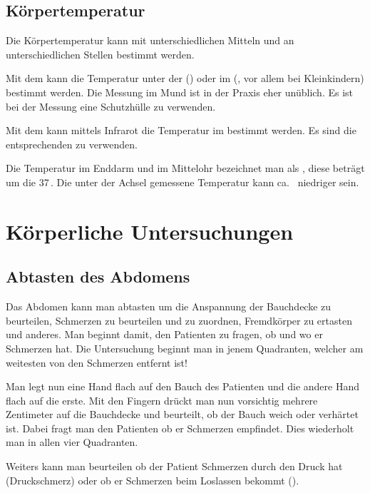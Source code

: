 \subsection{Körpertemperatur}

Die Körpertemperatur kann mit unterschiedlichen Mitteln und
an unterschiedlichen Stellen bestimmt werden. 

{
Mit dem
 kann die Temperatur
unter der  () oder im 
(, vor allem bei Kleinkindern) bestimmt werden. Die
Messung im Mund ist in der Praxis eher unüblich. Es ist bei der Messung eine
Schutzhülle zu verwenden. 

Mit dem  kann mittels Infrarot die
Temperatur im  bestimmt werden. Es sind die
entsprechenden  zu verwenden.

Die Temperatur im Enddarm und im Mittelohr bezeichnet man
als , diese beträgt um die
37\,\textcelsius. Die unter der Achsel gemessene Temperatur
kann ca. \,\textcelsius{} niedriger sein.
}{
{\SymbolText}
}


\section{Körperliche Untersuchungen}

\subsection{Abtasten des Abdomens}

{\label{topic:untersuchung-abdomen-abtasten}
Das Abdomen kann man abtasten um die Anspannung der
Bauchdecke zu beurteilen, Schmerzen zu
beurteilen und zu zuordnen, Fremdkörper zu ertasten und
anderes. Man beginnt damit, den Patienten zu fragen, ob und wo er 
Schmerzen hat. Die Untersuchung
beginnt man in jenem Quadranten, welcher am weitesten von den
Schmerzen entfernt ist!

Man legt nun eine Hand flach auf den Bauch des Patienten und
die andere Hand flach auf die erste. Mit den Fingern drückt
man nun vorsichtig mehrere Zentimeter auf die Bauchdecke und
beurteilt, ob der Bauch weich oder verhärtet ist. Dabei
fragt man den Patienten ob er Schmerzen empfindet. Dies
wiederholt man in allen vier Quadranten.

Weiters kann man beurteilen ob der Patient Schmerzen durch
den Druck hat (Druckschmerz) oder ob er Schmerzen beim
Loslassen bekommt
().
}
{
{\SymbolText}
}{}{}{}

